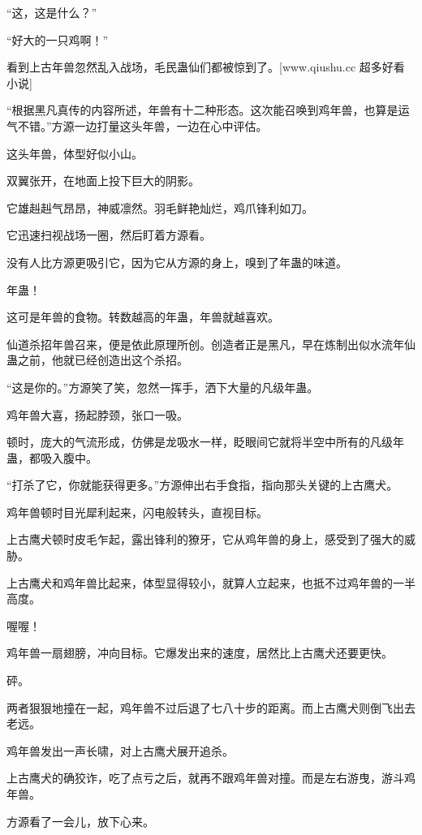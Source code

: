 
\begin{this_body}

“这，这是什么？”

“好大的一只鸡啊！”

看到上古年兽忽然乱入战场，毛民蛊仙们都被惊到了。[www.qiushu.cc 超多好看小说]

“根据黑凡真传的内容所述，年兽有十二种形态。这次能召唤到鸡年兽，也算是运气不错。”方源一边打量这头年兽，一边在心中评估。

这头年兽，体型好似小山。

双翼张开，在地面上投下巨大的阴影。

它雄赳赳气昂昂，神威凛然。羽毛鲜艳灿烂，鸡爪锋利如刀。

它迅速扫视战场一圈，然后盯着方源看。

没有人比方源更吸引它，因为它从方源的身上，嗅到了年蛊的味道。

年蛊！

这可是年兽的食物。转数越高的年蛊，年兽就越喜欢。

仙道杀招年兽召来，便是依此原理所创。创造者正是黑凡，早在炼制出似水流年仙蛊之前，他就已经创造出这个杀招。

“这是你的。”方源笑了笑，忽然一挥手，洒下大量的凡级年蛊。

鸡年兽大喜，扬起脖颈，张口一吸。

顿时，庞大的气流形成，仿佛是龙吸水一样，眨眼间它就将半空中所有的凡级年蛊，都吸入腹中。

“打杀了它，你就能获得更多。”方源伸出右手食指，指向那头关键的上古鹰犬。

鸡年兽顿时目光犀利起来，闪电般转头，直视目标。

上古鹰犬顿时皮毛乍起，露出锋利的獠牙，它从鸡年兽的身上，感受到了强大的威胁。

上古鹰犬和鸡年兽比起来，体型显得较小，就算人立起来，也抵不过鸡年兽的一半高度。

喔喔！

鸡年兽一扇翅膀，冲向目标。它爆发出来的速度，居然比上古鹰犬还要更快。

砰。

两者狠狠地撞在一起，鸡年兽不过后退了七八十步的距离。而上古鹰犬则倒飞出去老远。

鸡年兽发出一声长啸，对上古鹰犬展开追杀。

上古鹰犬的确狡诈，吃了点亏之后，就再不跟鸡年兽对撞。而是左右游曳，游斗鸡年兽。

方源看了一会儿，放下心来。


\end{this_body}
